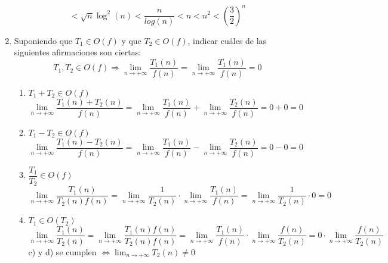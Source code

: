 \documentclass{article}
\makeatletter
\newcommand{\leqnomode}{\tagsleft@true\let\veqno\@@leqno}
\makeatother
\begin{document}
\begin{enumerate}
\leqnomode
\begin{equation}
	<\sqrt{n}\log^2(n)<\dfrac{n}{log(n)}<n<n^2<\left(\dfrac{3}{2}\right)^n\tag{*}
\end{equation}
\item Suponiendo que $T_1\in O(f)$ y que $T_2\in O(f)$, indicar cuáles de las siguientes afirmaciones son ciertas:
\[
	T_1, T_2\in O(f)\Rightarrow \displaystyle{\lim_{n \to +\infty}} \dfrac{T_1(n)}{f(n)}=\displaystyle{\lim_{n \to +\infty}}\dfrac{T_1(n)}{f(n)}=0
\]
\begin{enumerate}
	\item $T_1+T_2\in O(f)$
	\[
		\displaystyle{\lim_{n \to +\infty}} \dfrac{T_1(n)+T_2(n)}{f(n)}=\displaystyle{\lim_{n \to +\infty}} \dfrac{T_1(n)}{f(n)}+\displaystyle{\lim_{n \to +\infty}} \dfrac{T_2(n)}{f(n)}=0+0=0
	\]
	\item $T_1-T_2\in O(f)$
	\[
		\displaystyle{\lim_{n \to +\infty}} \dfrac{T_1(n)-T_2(n)}{f(n)}=\displaystyle{\lim_{n \to +\infty}} \dfrac{T_1(n)}{f(n)}-\displaystyle{\lim_{n \to +\infty}} \dfrac{T_2(n)}{f(n)}=0-0=0
	\]
	\item $\dfrac{T_1}{T_2}\in O(f)$
	\[
	\displaystyle{\lim_{n \to +\infty}} \dfrac{T_1(n)}{T_2(n)f(n)}=\displaystyle{\lim_{n \to +\infty}} \dfrac{1}{T_2(n)}\cdot\displaystyle{\lim_{n \to +\infty}} \dfrac{T_1(n)}{f(n)}=\displaystyle{\lim_{n \to +\infty}} \dfrac{1}{T_2(n)}\cdot 0=0
	\]
	\item $T_1\in O(T_2)$
	\[
		\displaystyle{\lim_{n \to +\infty}} \dfrac{T_1(n)}{T_2(n)}=\displaystyle{\lim_{n \to +\infty}} \dfrac{T_1(n)f(n)}{T_2(n)f(n)}=\displaystyle{\lim_{n \to +\infty}} \dfrac{T_1(n)}{f(n)}\cdot \displaystyle{\lim_{n \to +\infty}} \dfrac{f(n)}{T_2(n)}=0\cdot \displaystyle{\lim_{n \to +\infty}} \dfrac{f(n)}{T_2(n)}
	\]
	c) y d) se cumplen $\Leftrightarrow \displaystyle{\lim_{n \to +\infty}} T_2(n) \ne 0$
\end{enumerate}


\end{enumerate}
\end{document}
